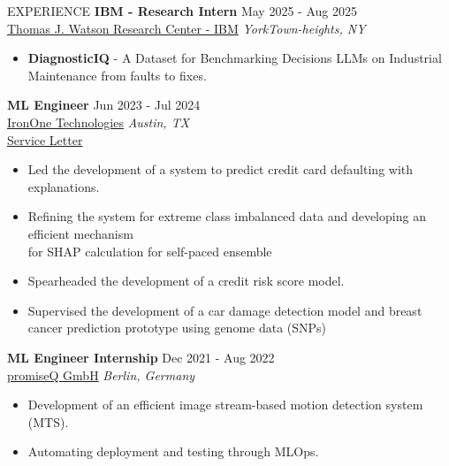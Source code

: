 \documentclass{resume} %
\begin{document}
\begin{rSection}{EXPERIENCE}
\textbf{IBM - Research Intern} \hfill May 2025 - Aug 2025\\
\href{https://research.ibm.com/labs/yorktown-heights}{Thomas J. Watson Research Center - IBM} \hfill \textit{YorkTown-heights, NY} \\
 \begin{itemize}
    \itemsep -15pt {} 
     \item \textbf{DiagnosticIQ} - A Dataset for Benchmarking Decisions LLMs on Industrial Maintenance from faults to fixes.
 \end{itemize}
 
\textbf{ML Engineer} \hfill Jun 2023 - Jul 2024\\
\href{https://irononeailabs.com}{IronOne Technologies} \hfill \textit{Austin, TX} \\
\href{https://drive.google.com/file/d/18g-9RbiW1LLCa3f9J8CWWccwRikGCOnR/view?usp=sharing}{Service Letter}
 \begin{itemize}
    \itemsep -3pt {} 
     \item Led the development of a system to predict credit card defaulting with explanations.
     \item Refining the system for extreme class imbalanced data and developing an efficient mechanism \\ for SHAP calculation for self-paced ensemble
    \item Spearheaded the development of a credit risk score model.
    \item Supervised the development of a car damage detection model and breast cancer prediction prototype using genome data (SNPs)
 \end{itemize}
 
\textbf{ML Engineer Internship} \hfill Dec 2021 - Aug 2022\\
\href{https://www.promiseq.com}{promiseQ GmbH} \hfill \textit{Berlin, Germany}
 \begin{itemize}
    \itemsep -3pt {} 
     \item Development of an efficient image stream-based motion detection system (MTS).
     \item Automating deployment and testing through MLOps.
 \end{itemize}

\end{rSection} 

\end{document}

